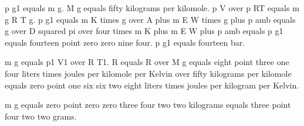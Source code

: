 p g1 equals m g. M g equals fifty kilograms per kilomole. p V over p RT equals m g R T g. p g1 equals m K times g over A plus m E W times g plus p amb equals g over D squared pi over four times m K plus m E W plus p amb equals p g1 equals fourteen point zero zero nine four. p g1 equals fourteen bar.

m g equals p1 V1 over R T1. R equals R over M g equals eight point three one four liters times joules per kilomole per Kelvin over fifty kilograms per kilomole equals zero point one six six two eight liters times joules per kilogram per Kelvin.

m g equals zero point zero zero three four two two kilograms equals three point four two two grams.
